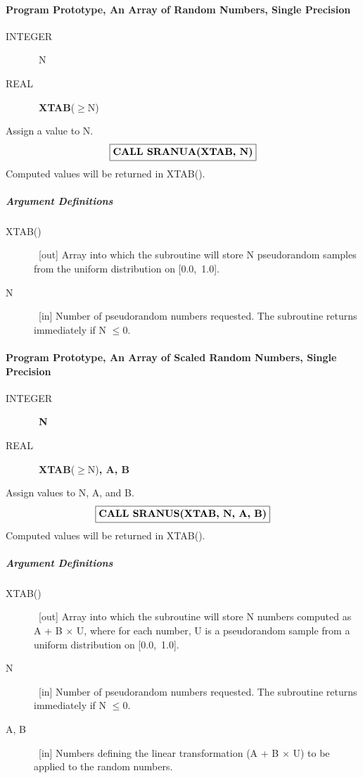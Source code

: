 \documentclass[twoside]{MATH77}
\begin{document}
\paragraph{Program Prototype, An Array of Random Numbers, Single Precision}

\begin{description}
\item[INTEGER]  \  N

\item[REAL]  \ {\bf XTAB}($\geq $N)
\end{description}

Assign a value to N.
$$
\fbox{{\bf CALL SRANUA(XTAB, N)}}
$$
Computed values will be returned in XTAB().

\subparagraph{Argument Definitions}

\begin{description}
\item[XTAB()]  \ [out] Array into which the subroutine will store N
pseudorandom samples from the uniform distribution on [0.0,~1.0].

\item[N]  \ [in] Number of pseudorandom numbers requested. The subroutine
returns immediately if N $\leq 0.$
\end{description}

\paragraph{Program Prototype, An Array of Scaled Random Numbers, Single
Precision}

\begin{description}
\item[INTEGER]  \ {\bf N}

\item[REAL]  \ {\bf XTAB}($\geq $N){\bf , A, B}
\end{description}

Assign values to N, A, and B.
$$
\fbox{{\bf CALL SRANUS(XTAB, N, A, B)}}
$$
Computed values will be returned in XTAB().

\subparagraph{Argument Definitions}

\begin{description}
\item[XTAB()]  \ [out] Array into which the subroutine will store N numbers
computed as A + B $\times $ U, where for each number, U is a pseudorandom
sample from a uniform distribution on [0.0,~1.0].

\item[N]  \ [in] Number of pseudorandom numbers requested. The subroutine
returns immediately if N $\leq 0.$

\item[A, B] \ [in] Numbers defining the linear transformation (A + B
  $\times$ U) to be applied to the random numbers.
\end{description}
\end{document}
